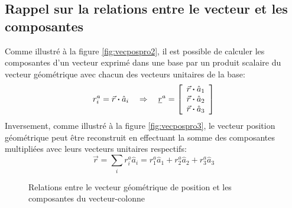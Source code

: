 \subsection{Rappel sur la relations entre le vecteur et les composantes}

Comme illustré à la figure \ref{fig:vecpospro2}, il est possible de calculer les composantes d'un vecteur exprimé dans une base par un produit scalaire du vecteur géométrique avec chacun des vecteurs unitaires de la base:
\begin{equation}
r_i^a = \vec{r} \boldsymbol{\cdot} \hat{a}_i  \quad \Rightarrow \quad 
\underline{r}^{a} = \left[ \begin{array}{c} \vec{r} \boldsymbol{\cdot} \hat{a}_1 \\ \vec{r} \boldsymbol{\cdot} \hat{a}_2 \\ \vec{r} \boldsymbol{\cdot} \hat{a}_3  \end{array} \right] 
\end{equation} 
Inversement, comme illustré à la figure \ref{fig:vecpospro3}, le vecteur position géométrique peut être reconstruit en effectuant la somme des composantes multipliées avec leurs vecteurs unitaires respectifs:
\begin{equation}
\vec{r} = \sum_{i} r_i^a \hat{a}_i = r_1^a \hat{a}_1 + r_2^a \hat{a}_2 + r_3^a \hat{a}_3%
\end{equation} 
\begin{figure}[htb]
        \centering
				\hspace{+20pt}
        \caption{Relations entre le vecteur géométrique de position et les composantes du vecteur-colonne}
				\label{fig:vecpospro23}
\end{figure}


